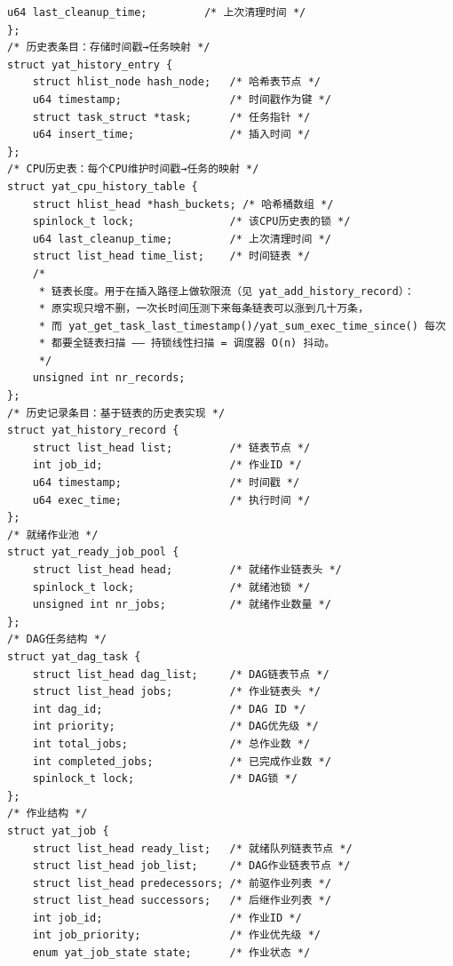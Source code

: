 \documentclass[10pt,a4paper]{article}
\newenvironment{yatpage}{\vspace*{0pt}}{\par}
\begin{document}
\begin{yatpage}
\begin{Verbatim}[fontsize=\fontsize{8.2}{9.8}\selectfont]
    u64 last_cleanup_time;         /* 上次清理时间 */
};
/* 历史表条目：存储时间戳→任务映射 */
struct yat_history_entry {
    struct hlist_node hash_node;   /* 哈希表节点 */
    u64 timestamp;                 /* 时间戳作为键 */
    struct task_struct *task;      /* 任务指针 */
    u64 insert_time;               /* 插入时间 */
};
/* CPU历史表：每个CPU维护时间戳→任务的映射 */
struct yat_cpu_history_table {
    struct hlist_head *hash_buckets; /* 哈希桶数组 */
    spinlock_t lock;               /* 该CPU历史表的锁 */
    u64 last_cleanup_time;         /* 上次清理时间 */
    struct list_head time_list;    /* 时间链表 */
    /*
     * 链表长度。用于在插入路径上做软限流（见 yat_add_history_record）：
     * 原实现只增不删，一次长时间压测下来每条链表可以涨到几十万条，
     * 而 yat_get_task_last_timestamp()/yat_sum_exec_time_since() 每次
     * 都要全链表扫描 —— 持锁线性扫描 = 调度器 O(n) 抖动。
     */
    unsigned int nr_records;
};
/* 历史记录条目：基于链表的历史表实现 */
struct yat_history_record {
    struct list_head list;         /* 链表节点 */
    int job_id;                    /* 作业ID */
    u64 timestamp;                 /* 时间戳 */
    u64 exec_time;                 /* 执行时间 */
};
/* 就绪作业池 */
struct yat_ready_job_pool {
    struct list_head head;         /* 就绪作业链表头 */
    spinlock_t lock;               /* 就绪池锁 */
    unsigned int nr_jobs;          /* 就绪作业数量 */
};
/* DAG任务结构 */
struct yat_dag_task {
    struct list_head dag_list;     /* DAG链表节点 */
    struct list_head jobs;         /* 作业链表头 */
    int dag_id;                    /* DAG ID */
    int priority;                  /* DAG优先级 */
    int total_jobs;                /* 总作业数 */
    int completed_jobs;            /* 已完成作业数 */
    spinlock_t lock;               /* DAG锁 */
};
/* 作业结构 */
struct yat_job {
    struct list_head ready_list;   /* 就绪队列链表节点 */
    struct list_head job_list;     /* DAG作业链表节点 */
    struct list_head predecessors; /* 前驱作业列表 */
    struct list_head successors;   /* 后继作业列表 */
    int job_id;                    /* 作业ID */
    int job_priority;              /* 作业优先级 */
    enum yat_job_state state;      /* 作业状态 */
\end{Verbatim}
\end{yatpage}
\newpage
\end{document}
